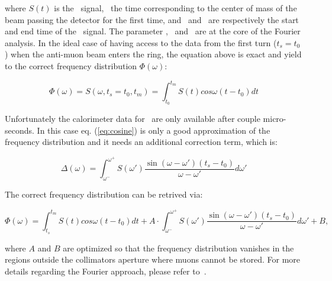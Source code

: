 where $S(t)$ is the \fr\ signal, \tz\ the time corresponding to the center of mass of the beam passing the detector for the first time,
and \ts\ and \tm\ are respectively the start and end time of the \fr\ signal. The parameter \tz, \ts\ and \tm\ are at the core of the
Fourier analysis. In the ideal case of having access to the data from the first turn ($t_{s}=t_{0}$) when the anti-muon beam enters the 
ring, the equation above is exact and yield to the correct frequency distribution $\Phi(\omega)$: 

\begin{equation}
    \Phi(\omega) = S(\omega,t_{s}=t_{0},t_{m}) = \int^{t_{m}}_{t_{0}} S(t) cos\omega(t-t_{0})dt
\end{equation}

Unfortunately the calorimeter data for \runo\ are only
available after couple micro-seconds. In this case eq. (\ref{eq:cosine}) is only a good approximation of the frequency distribution and it needs an additional
correction term, which is:

\begin{equation}
    \Delta(\omega)=\int^{\omega^+}_{\omega^-}{S}(\omega')\frac{\sin(\omega-\omega')(t_s-t_0)}{\omega-\omega'}d\omega'
    \label{eq:OrlovDelta}
\end{equation}

The correct frequency distribution can be retrived via:

\begin{equation}
    \Phi(\omega) = \int^{t_{m}}_{t_{s}} S(t) cos\omega(t-t_{0})dt + A \cdot \int^{\omega^+}_{\omega^-}{S}(\omega')\frac{\sin(\omega-\omega')(t_s-t_0)}{\omega-\omega'}d\omega' + B,
\end{equation}

where $A$ and $B$ are optimized so that the frequency distribution vanishes in the regions outside the collimators aperture where muons cannot be stored.
For more details regarding the Fourier approach, please refer to~\cite{orlov, daniel}.
